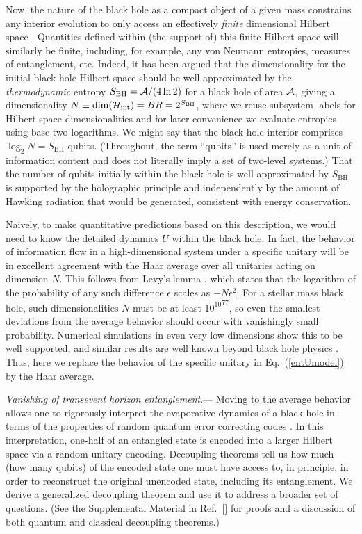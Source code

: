 \documentclass[twocolumn,aps,showpacs,prl]{revtex4}
\begin{document}
Now, the nature of the black hole as a compact object of a given mass 
constrains any interior evolution to only access an effectively {\it 
finite\/} dimensional Hilbert space \cite{B10}. Quantities defined within
(the support of) this finite Hilbert space will similarly be finite,
including, for example, any von Neumann entropies, measures of
entanglement, etc. Indeed, it has been argued \cite{Susskind93}
that the dimensionality for the initial black hole Hilbert space should
be well approximated by the {\it thermodynamic\/} entropy
$S_{\text{BH}}={\cal A}/(4\ln 2)$ for a black hole of area ${\cal A}$,
giving a dimensionality
$N\equiv\text{dim}({\cal H}_\text{int})= BR= 2^{S_{\text{BH}}}$,
where we reuse subsystem labels for Hilbert space dimensionalities
and for later convenience we evaluate entropies using base-two logarithms.
We might say that the black hole interior comprises
$\log_2 N=S_{\text{BH}}$ qubits. (Throughout, the term ``qubits'' is used
merely as a unit of information content and does not literally imply 
a set of two-level systems.) That the number of qubits
initially within the black hole is well approximated by $S_{\text{BH}}$
is supported by the holographic principle \cite{tHooft93} and 
independently by the amount of Hawking radiation that would be
generated, consistent with energy conservation. 

Naively, to make quantitative predictions based on this description,
we would need to know the detailed dynamics $U$ within the black hole.
In fact, the behavior of information flow in a high-dimensional system 
under a specific unitary will be in excellent agreement with the Haar 
average over all unitaries acting on dimension $N$. This follows from
Levy's lemma \cite{Levy}, which states that the logarithm of the
probability of any such difference $\epsilon$ scales as $-N \epsilon^2$. 
For a stellar mass black hole, such dimensionalities $N$ must be at least 
${10^{10}}^{77}$, so even the smallest deviations from the average behavior 
should occur with vanishingly small probability. Numerical simulations
in even very low dimensions show this to be well supported, and similar
results are well known beyond black hole physics \cite{Mehta}. Thus, here
we replace the behavior of the specific unitary in Eq.~(\ref{entUmodel}) 
by the Haar average.

{\it Vanishing of transevent horizon entanglement}.---%
Moving to the average behavior allows one to
rigorously interpret the evaporative dynamics of a black hole in terms
of the properties of random quantum error correcting codes \cite{Hayden07}.
In this interpretation, one-half of an entangled state is encoded
into a larger Hilbert space via a random unitary encoding. Decoupling
theorems \cite{Abey06} tell us how much (how many qubits) of the encoded
state one must have access to, in principle, in order to reconstruct the
original unencoded state, including its entanglement. We derive a
generalized decoupling theorem and use it to address a broader set of
questions. (See the Supplemental Material in Ref.~[] for
proofs and a discussion of both quantum and classical decoupling
theorems.)
\end{document}
